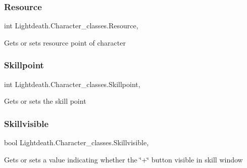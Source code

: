 \subsubsection{\texorpdfstring{Resource}{Resource}}
{\footnotesize\ttfamily int Lightdeath.\+Character\+\_\+classes.\+Resource\hspace{0.3cm}{\ttfamily [get]}, {\ttfamily [set]}}



Gets or sets resource point of character 

\hypertarget{class_lightdeath_1_1_character__classes_ac11ac087b9c402dd158b55cd340c6798}{}\label{class_lightdeath_1_1_character__classes_ac11ac087b9c402dd158b55cd340c6798} 
\subsubsection{\texorpdfstring{Skillpoint}{Skillpoint}}
{\footnotesize\ttfamily int Lightdeath.\+Character\+\_\+classes.\+Skillpoint\hspace{0.3cm}{\ttfamily [get]}, {\ttfamily [set]}}



Gets or sets the skill point 

\hypertarget{class_lightdeath_1_1_character__classes_a61657a10d7705a17f356c4bf9033d18d}{}\label{class_lightdeath_1_1_character__classes_a61657a10d7705a17f356c4bf9033d18d} 
\subsubsection{\texorpdfstring{Skillvisible}{Skillvisible}}
{\footnotesize\ttfamily bool Lightdeath.\+Character\+\_\+classes.\+Skillvisible\hspace{0.3cm}{\ttfamily [get]}, {\ttfamily [set]}}



Gets or sets a value indicating whether the \char`\"{}+\char`\"{} button visible in skill window 

\hypertarget{class_lightdeath_1_1_character__classes_a9646006f2f6946c26d2252b4d6aadb87}{}\label{class_lightdeath_1_1_character__classes_a9646006f2f6946c26d2252b4d6aadb87} 
